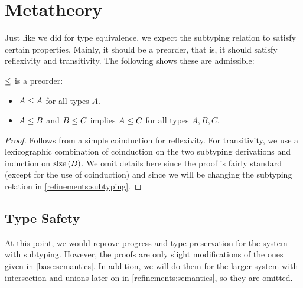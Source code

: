 
\section{Metatheory}

Just like we did for type equivalence, we expect the subtyping relation to satisfy certain properties. Mainly, it should be a preorder, that is, it should satisfy reflexivity and transitivity. The following  shows these are admissible:

\begin{theorem}
  \label{base:sub-is-preorder}
  $\le$ is a preorder:
  \begin{itemize}
    \item $A \le A$ for all types $A$.
    \item $A \le B$ and $B \le C$ implies $A \le C$ for all types $A, B, C$.
  \end{itemize}
\end{theorem}
\begin{proof}
  Follows from a simple coinduction for reflexivity. For transitivity, we use a lexicographic combination of coinduction on the two subtyping derivations and induction on $\operatorname{size}{(B)}$.  We omit details here since the proof is fairly standard (except for the use of coinduction) and since we will be changing the subtyping relation in \cref{refinements:subtyping}.
\end{proof}


\subsection{Type Safety}

At this point, we would reprove progress and type preservation for the system with subtyping. However, the proofs are only slight modifications of the ones given in \cref{base:semantics}. In addition, we will do them for the larger system with intersection and unions later on in \cref{refinements:semantics}, so they are omitted.

